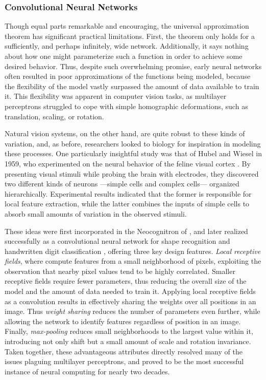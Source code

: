\subsubsection{Convolutional Neural Networks}
\label{subsec:convnets}


Though equal parts remarkable and encouraging, the universal approximation theorem has significant practical limitations.
First, the theorem only holds for a sufficiently, and perhaps infinitely, wide network.
Additionally, it says nothing about how one might parameterize such a function in order to achieve some desired behavior.
Thus, despite such overwhelming promise, early neural networks often resulted in poor approximations of the functions being modeled, because the flexibility of the model vastly surpassed the amount of data available to train it.
This flexibility was apparent in computer vision tasks, as multilayer perceptrons struggled to cope with simple homographic deformations, such as translation, scaling, or rotation.

Natural vision systems, on the other hand, are quite robust to these kinds of variation, and, as before, researchers looked to biology for inspiration in modeling these processes.
One particularly insightful study was that of Hubel and Wiesel in 1959, who experimented on the neural behavior of the feline visual cortex \cite{Hubel1959Receptive}.
By presenting visual stimuli while probing the brain with electrodes, they discovered two different kinds of neurons ---simple cells and complex cells--- organized hierarchically.
Experimental results indicated that the former is responsible for local feature extraction, while the latter combines the inputs of simple cells to absorb small amounts of variation in the observed stimuli.

These ideas were first incorporated in the Neocognitron of \cite{Fukushima1988Neocognitron}, and later realized successfully as a convolutional neural network for shape recognition and handwritten digit classification \cite{LeCun1998Gradient}, offering three key design features.
\emph{Local receptive fields}, where compute features from a small neighborhood of pixels, exploiting the observation that nearby pixel values tend to be highly correlated.
Smaller receptive fields require fewer parameters, thus reducing the overall size of the model and the amount of data needed to train it.
Applying local receptive fields as a convolution results in effectively sharing the weights over all positions in an image.
Thus \emph{weight sharing} reduces the number of parameters even further, while allowing the network to identify features regardless of position in an image.
Finally, \emph{max-pooling} reduces small neighborhoods to the largest value within it, introducing not only shift but a small amount of scale and rotation invariance.
Taken together, these advantageous attributes directly resolved many of the issues plaguing multilayer perceptrons, and proved to be the most successful instance of neural computing for nearly two decades.


